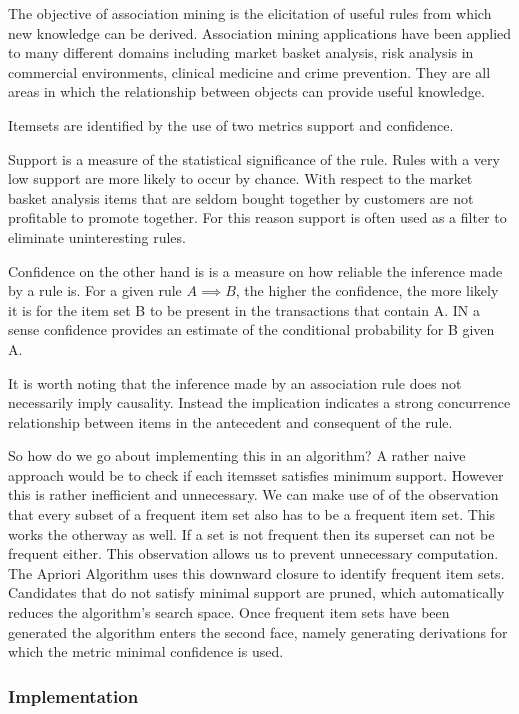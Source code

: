The objective of association  mining is the elicitation of useful rules from which new knowledge can be derived. Association mining applications have been applied to many different domains including market basket analysis, risk analysis in commercial environments, clinical medicine and crime prevention. They are all areas in which the relationship between objects can provide useful knowledge. 

Itemsets are identified by the use of two metrics support and confidence. 

Support is a measure of the statistical significance of the rule. Rules with a very low support are more likely to occur by chance. With respect to the market basket analysis items that are seldom bought together by customers are not profitable to promote together. For this reason support is often used as a filter to eliminate uninteresting rules. 

Confidence on the other hand is is a measure on how reliable the inference made by a rule is. For a given rule $A \implies B$, the higher the confidence, the more likely it is for the item set B to be present in the transactions that contain A. IN a sense confidence provides an estimate of the conditional probability for B given A. 

It is worth noting that the inference made by an association rule does not necessarily imply causality. Instead the implication indicates a strong concurrence relationship between items in the antecedent and consequent of the rule. 

So how do we go about implementing this in an algorithm? A rather naive approach would be to check if each itemsset satisfies minimum support. However this is rather inefficient and unnecessary. We can make use of of the observation that every subset of a frequent item set also has to be a frequent item set. This works the otherway as well. If a set is not frequent then its superset can not be frequent either. This observation allows us to prevent unnecessary computation. The Apriori Algorithm uses this downward closure to identify frequent item sets. Candidates that do not satisfy minimal support are pruned, which automatically reduces the algorithm's search space. Once frequent item sets have been generated the algorithm enters the second face, namely generating derivations for which the metric minimal confidence is used. 

\subsubsection{Implementation}

